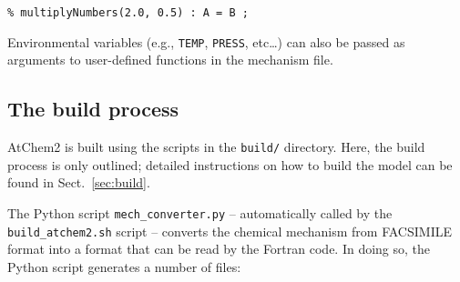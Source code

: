 \begin{verbatim}
% multiplyNumbers(2.0, 0.5) : A = B ;
\end{verbatim}

Environmental variables (e.g., \texttt{TEMP}, \texttt{PRESS},
etc\ldots) can also be passed as arguments to user-defined functions
in the mechanism file.

\subsection{The build process} \label{subsec:build-process}

AtChem2 is built using the scripts in the \texttt{build/}
directory. Here, the build process is only outlined; detailed
instructions on how to build the model can be found in
Sect.~\ref{sec:build}.

The Python script \texttt{mech\_converter.py} -- automatically called
by the \texttt{build\_atchem2.sh} script -- converts the chemical
mechanism from FACSIMILE format into a format that can be read by the
Fortran code. In doing so, the Python script generates a number of
files:

